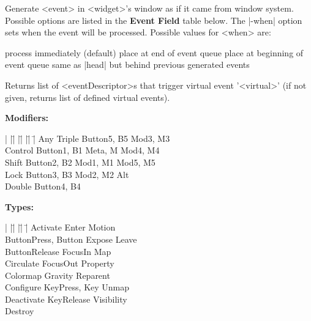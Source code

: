 \begin{enum}{1cm}
Generate <event> in <widget>'s window as if it came from window system.
Possible options are listed in the {\bf Event Field} table below.
The |-when| option sets when the event will be processed.
Possible values for <when> are:
\begin{enum}{1cm}
 process immediately (default)
 place at end of event queue
 place at beginning of event queue
 same as |head| but behind previous generated events
\end{enum} 
Returns list of <eventDescriptor>s that trigger virtual event '\lt\lt<virtual>\gt\gt'
(if not given, returns list of defined virtual events).

\end{enum}

\vskip6pt
{\bf Modifiers:}
\begin{tabbing}
|  |\=|          |\=|             |\=|             |\= \kill
   \> Any	 \> Triple        \> Button5, B5   \> Mod3, M3 \\
   \> Control	 \> Button1, B1   \> Meta, M       \> Mod4, M4 \\ 	
   \> Shift	 \> Button2, B2   \> Mod1, M1      \> Mod5, M5 \\ 	
   \> Lock	 \> Button3, B3   \> Mod2, M2      \> Alt \\      	
   \> Double	 \> Button4, B4 \\
\end{tabbing}

{\bf Types:}
\begin{tabbing}
|  |\=|                   |\=|                  |\= \kill
   \> Activate            \> Enter              \> Motion \\
   \> ButtonPress, Button \> Expose             \> Leave \\     
   \> ButtonRelease       \> FocusIn            \> Map \\       
   \> Circulate           \> FocusOut           \> Property \\  
   \> Colormap            \> Gravity            \> Reparent \\  
   \> Configure           \> KeyPress, Key      \> Unmap \\     
   \> Deactivate          \> KeyRelease         \> Visibility \\
   \> Destroy \\
\end{tabbing}

